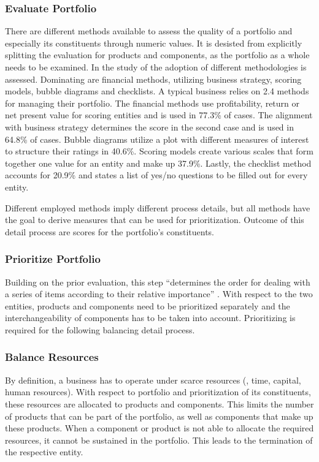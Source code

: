 	\subsubsection{Evaluate Portfolio}
	There are different methods available to assess the quality of a portfolio and especially its constituents through numeric values. It is desisted from explicitly splitting the evaluation for products and components, as the portfolio as a whole needs to be examined. In the study of \cite{cooper1999new} the adoption of different methodologies is assessed. Dominating are financial methods, utilizing business strategy, scoring models, bubble diagrams and checklists. A typical business relies on 2.4 methods for managing their portfolio. The financial methods use profitability, return or net present value for scoring entities and is used in 77.3\% of cases. The alignment with business strategy determines the score in the second case and is used in 64.8\% of cases. Bubble diagrams utilize a plot with different measures of interest to structure their ratings in 40.6\%. Scoring models create various scales that form together one value for an entity and make up 37.9\%. Lastly, the checklist method accounts for 20.9\% and states a list of yes/no questions to be filled out for every entity.  
	
	Different employed methods imply different process details, but all methods have the goal to derive measures that can be used for prioritization. Outcome of this detail process are scores for the portfolio's constituents. 
	
	\subsubsection{Prioritize Portfolio}
	Building on the prior evaluation, this step \enquote{determines the order for dealing with a series of items according to their relative importance} \citep{oxfordprioritize}. With respect to the two entities, products and components need to be prioritized separately and the interchangeability of components has to be taken into account. Prioritizing is required for the following balancing detail process. 
	\subsubsection{Balance Resources}
	By definition, a business has to operate under scarce resources (\eg, time, capital, human resources). With respect to portfolio and prioritization of its constituents, these resources are allocated to products and components. This limits the number of products that can be part of the portfolio, as well as components that make up these products. When a component or product is not able to allocate the required resources, it cannot be sustained in the portfolio.
	This leads to the termination of the respective entity.
	
